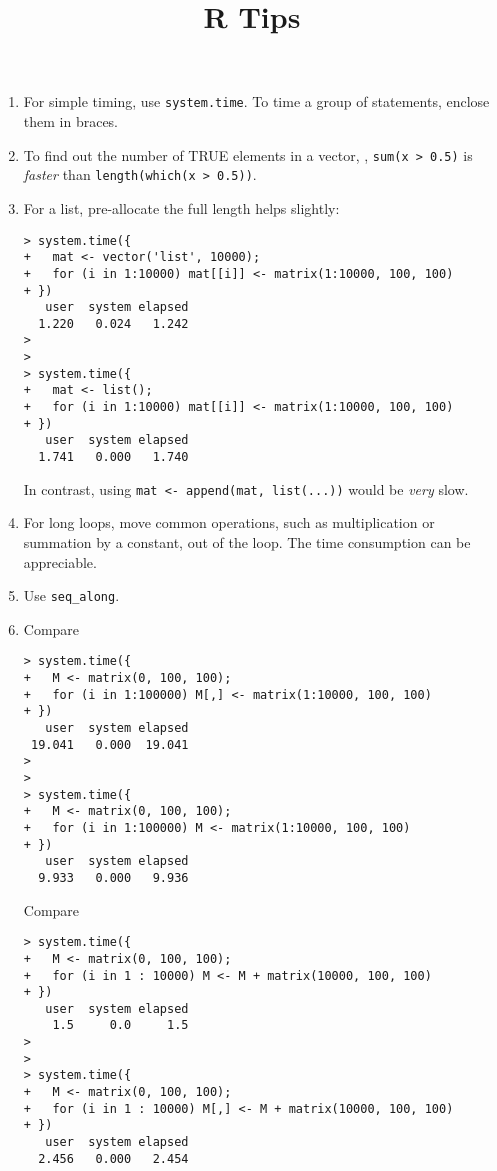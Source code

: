 \documentclass[12pt]{article}
\newcommand\Rf[1]{\texttt{#1}}
\begin{document}
\title{R Tips}
\maketitle

\begin{enumerate}

\item
For simple timing, use \Rf{system.time}.
To time a group of statements, enclose them in braces.

\item
To find out the number of TRUE elements in a vector, \eg,
\Rf{sum(x > 0.5)} is \emph{faster} than
\Rf{length(which(x > 0.5))}.

\item
For a list, pre-allocate the full length helps slightly:
\begin{verbatim}
> system.time({
+   mat <- vector('list', 10000);
+   for (i in 1:10000) mat[[i]] <- matrix(1:10000, 100, 100)
+ })
   user  system elapsed
  1.220   0.024   1.242
>
>
> system.time({
+   mat <- list();
+   for (i in 1:10000) mat[[i]] <- matrix(1:10000, 100, 100)
+ })
   user  system elapsed
  1.741   0.000   1.740
\end{verbatim}
In contrast, using
\Rf{mat <- append(mat, list(...))}
would be \emph{very} slow.

\item
For long loops,
move common operations,
such as multiplication or summation by a constant,
out of the loop.
The time consumption can be appreciable.

\item
Use \Rf{seq\_along}.

\item
Compare
\begin{verbatim}
> system.time({
+   M <- matrix(0, 100, 100);
+   for (i in 1:100000) M[,] <- matrix(1:10000, 100, 100)
+ })
   user  system elapsed
 19.041   0.000  19.041
>
>
> system.time({
+   M <- matrix(0, 100, 100);
+   for (i in 1:100000) M <- matrix(1:10000, 100, 100)
+ })
   user  system elapsed
  9.933   0.000   9.936
\end{verbatim}

Compare
\begin{verbatim}
> system.time({
+   M <- matrix(0, 100, 100);
+   for (i in 1 : 10000) M <- M + matrix(10000, 100, 100)
+ })
   user  system elapsed
    1.5     0.0     1.5
>
>
> system.time({
+   M <- matrix(0, 100, 100);
+   for (i in 1 : 10000) M[,] <- M + matrix(10000, 100, 100)
+ })
   user  system elapsed
  2.456   0.000   2.454
\end{verbatim}


\end{enumerate}
\end{document}

